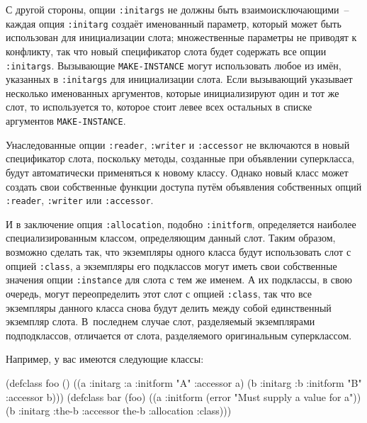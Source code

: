 С другой стороны, опции \lstinline{:initargs} не должны быть взаимоисключающими~-- каждая опция
\lstinline{:initarg} создаёт именованный параметр, который может быть использован для
инициализации слота; множественные параметры не приводят к конфликту, так что новый
спецификатор слота будет содержать все опции \lstinline{:initargs}. Вызывающие
\lstinline{MAKE-INSTANCE} могут использовать любое из имён, указанных в \lstinline{:initargs} для
инициализации слота. Если вызывающий указывает несколько именованных аргументов, которые
инициализируют один и тот же слот, то используется то, которое стоит левее всех остальных
в списке аргументов \lstinline{MAKE-INSTANCE}.

Унаследованные опции \lstinline{:reader}, \lstinline{:writer} и \lstinline{:accessor} не включаются в
новый спецификатор слота, поскольку методы, созданные при объявлении суперкласса, будут
автоматически применяться к новому классу.  Однако новый класс может создать свои
собственные функции доступа путём объявления собственных опций \lstinline{:reader},
\lstinline{:writer} или \lstinline{:accessor}.

И в заключение опция \lstinline{:allocation}, подобно \lstinline{:initform}, определяется наиболее
специализированным классом, определяющим данный слот.  Таким образом, возможно сделать
так, что экземпляры одного класса будут использовать слот с опцией \lstinline{:class}, а
экземпляры его подклассов могут иметь свои собственные значения опции \lstinline{:instance} для
слота с тем же именем.  А их подклассы, в свою очередь, могут переопределить этот слот с
опцией \lstinline{:class}, так что все экземпляры данного класса снова будут делить между собой
единственный экземпляр слота.  В~последнем случае слот, разделяемый экземплярами
подподклассов, отличается от слота, разделяемого оригинальным суперклассом.

Например, у вас имеются следующие классы:

\begin{myverb}
(defclass foo ()
  ((a :initarg :a :initform "A" :accessor a)
   (b :initarg :b :initform "B" :accessor b)))
(defclass bar (foo)
  ((a :initform (error "Must supply a value for a"))
   (b :initarg :the-b :accessor the-b :allocation :class)))
\end{myverb}


